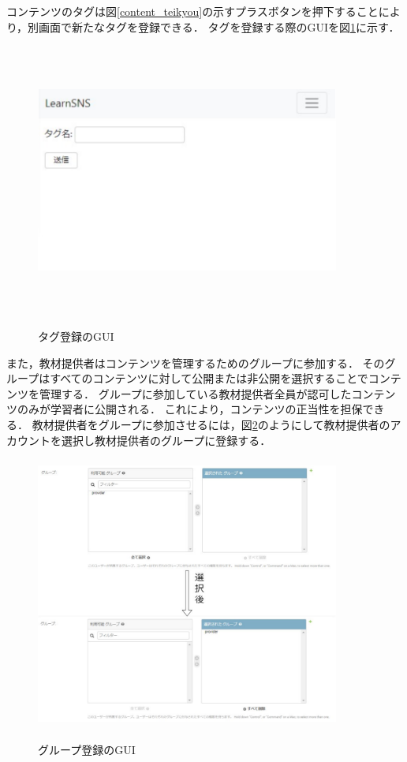 \newpage
コンテンツのタグは図\ref{content_teikyou}の示すプラスボタンを押下することにより，別画面で新たなタグを登録できる．
タグを登録する際のGUIを図\ref{tag}に示す．
\begin{figure}[htbp]
    \begin{center}
        \includegraphics[width=10cm,height=9cm,keepaspectratio]{tag-crop.pdf}\\
    \end{center}
    \caption{タグ登録のGUI}
    \label{tag}
\end{figure}

また，教材提供者はコンテンツを管理するためのグループに参加する．
そのグループはすべてのコンテンツに対して公開または非公開を選択することでコンテンツを管理する．
グループに参加している教材提供者全員が認可したコンテンツのみが学習者に公開される．
これにより，コンテンツの正当性を担保できる．
教材提供者をグループに参加させるには，図\ref{group_register}のようにして教材提供者のアカウントを選択し教材提供者のグループに登録する．

\begin{figure}[htbp]
    \begin{center}
        \includegraphics[width=10cm,height=9cm,keepaspectratio]{group_register-crop.pdf}\\
    \end{center}
    \caption{グループ登録のGUI}
    \label{group_register}
\end{figure}


